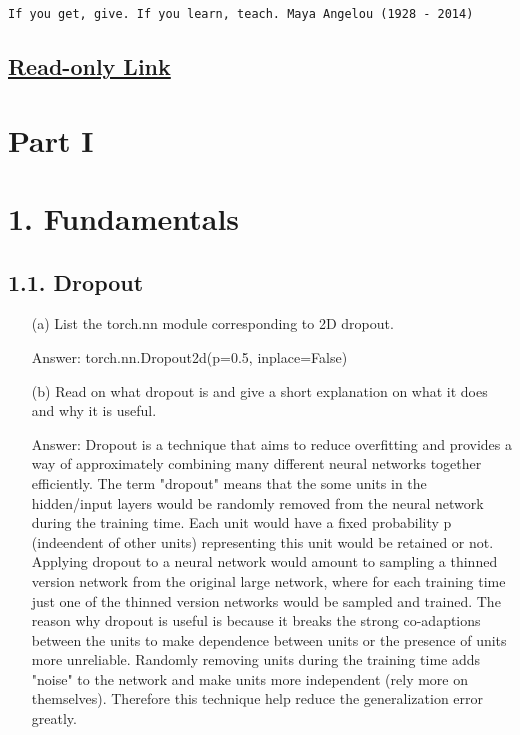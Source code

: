 \documentclass[12pt,letterpaper]{article}
\begin{document}
\begin{center}
\texttt{If you get, give.  If you learn, teach.  Maya Angelou (1928 - 2014)}
\end{center}
\subsection*{\centering  \href{https://www.overleaf.com/read/bsjxfktnsjsw
}{Read-only Link}
}
\section*{\centering Part I}

\section*{1. Fundamentals}
\subsection*{1.1. Dropout}
\begin{itemize}
    \item[(a)] List the torch.nn module corresponding to 2D dropout. 
    
    Answer: torch.nn.Dropout2d(p=0.5, inplace=False)
    
    \item[(b)] Read on what dropout is and give a short explanation on what it does and why it is useful. 
    
    Answer: Dropout is a technique that aims to reduce overfitting and provides a way of approximately combining many different neural networks together efficiently. The term "dropout" means that the some units in the hidden/input layers would be randomly removed from the neural network during the training time. Each unit would have a fixed probability p (indeendent of other units) representing this unit would be retained or not. Applying dropout to a neural network would amount to sampling a thinned version network from the original large network, where for each training time just one of the thinned version networks would be sampled and trained. The reason why dropout is useful is because it breaks the strong co-adaptions between the units to make dependence between units or the presence of units more unreliable. Randomly removing units during the training time adds "noise" to the network and make units more independent (rely more on themselves). Therefore this technique help reduce the generalization error greatly.
\end{itemize}
\end{document}
